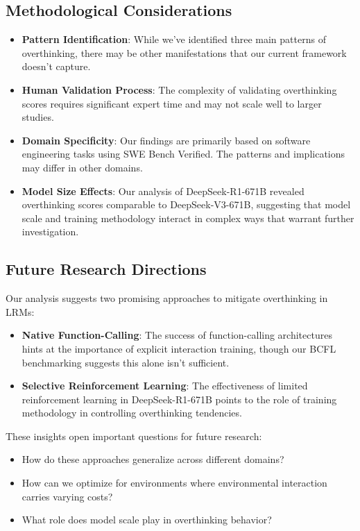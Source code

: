 \subsection{Methodological Considerations}
\begin{itemize}
    \item \textbf{Pattern Identification}: While we've identified three main patterns of overthinking, there may be other manifestations that our current framework doesn't capture.
    
    \item \textbf{Human Validation Process}: The complexity of validating overthinking scores requires significant expert time and may not scale well to larger studies.
    
    \item \textbf{Domain Specificity}: Our findings are primarily based on software engineering tasks using SWE Bench Verified. The patterns and implications may differ in other domains.
    
    \item \textbf{Model Size Effects}: Our analysis of DeepSeek-R1-671B revealed overthinking scores comparable to DeepSeek-V3-671B, suggesting that model scale and training methodology interact in complex ways that warrant further investigation.
\end{itemize}

\subsection{Future Research Directions}
Our analysis suggests two promising approaches to mitigate overthinking in LRMs:

\begin{itemize}
    \item \textbf{Native Function-Calling}: The success of function-calling architectures hints at the importance of explicit interaction training, though our BCFL benchmarking suggests this alone isn't sufficient.
    
    \item \textbf{Selective Reinforcement Learning}: The effectiveness of limited reinforcement learning in DeepSeek-R1-671B points to the role of training methodology in controlling overthinking tendencies.
\end{itemize}

These insights open important questions for future research:
\begin{itemize}
    \item How do these approaches generalize across different domains?
    \item How can we optimize for environments where environmental interaction carries varying costs?
    \item What role does model scale play in overthinking behavior?
\end{itemize}

